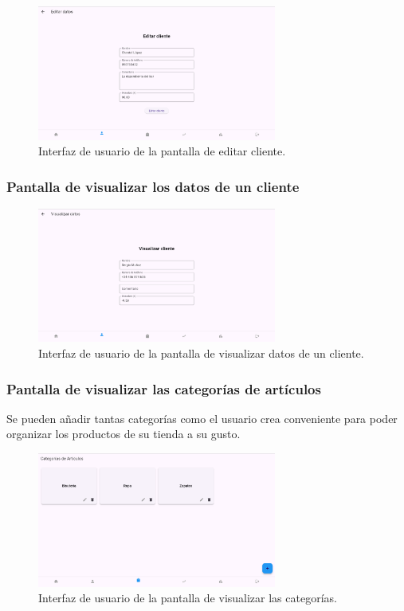 \begin{figure}[H]
	\centering
	\includegraphics[width=0.7\textwidth]{imagenes/PrimeraIteracion/editarCliente.png}
	\caption{Interfaz de usuario de la pantalla de editar cliente.}
	\label{fig:appEditarCliente}
\end{figure}

\subsubsection{Pantalla de visualizar los datos de un cliente}

\begin{figure}[H]
	\centering
	\includegraphics[width=0.7\textwidth]{imagenes/PrimeraIteracion/detallesCliente.png}
	\caption{Interfaz de usuario de la pantalla de visualizar datos de un cliente.}
	\label{fig:appDetallesCliente}
\end{figure}

\subsubsection{Pantalla de visualizar las categorías de artículos}

Se pueden añadir tantas categorías como el usuario crea conveniente para poder organizar los productos de su tienda a su gusto. 

\begin{figure}[H]
	\centering
	\includegraphics[width=0.7\textwidth]{imagenes/PrimeraIteracion/visualizarCategorias.png}
	\caption{Interfaz de usuario de la pantalla de visualizar las categorías.}
	\label{fig:appCategoriasArticulos}
\end{figure}

